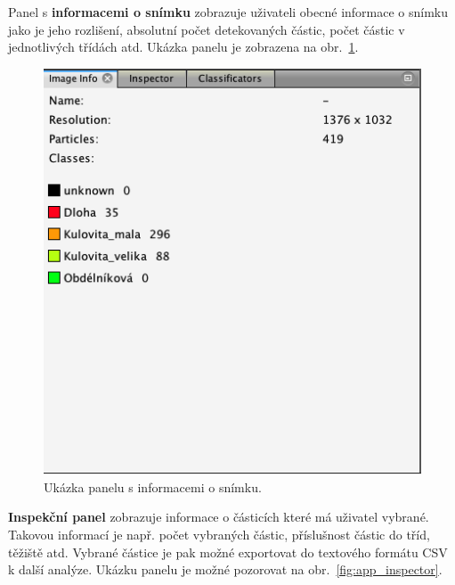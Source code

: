 \documentclass[11pt,twoside,a4paper,table]{book}
\begin{document}
Panel s \textbf{informacemi o snímku} zobrazuje uživateli obecné informace o snímku jako je jeho rozlišení, absolutní počet detekovaných částic, počet částic v jednotlivých třídách atd. Ukázka panelu je zobrazena na obr.~\ref{fig:app_image_info}.

\begin{figure}[h]
	\centering
	\includegraphics[scale=0.5]{figures/app_image_info.png}
	\caption{Ukázka panelu s informacemi o snímku.}
	\label{fig:app_image_info}
\end{figure}

\textbf{Inspekční panel} zobrazuje informace o částicích které má uživatel vybrané. Takovou informací je např. počet vybraných částic, příslušnost částic do tříd, těžiště atd. Vybrané částice je pak možné exportovat do textového formátu CSV k další analýze. Ukázku panelu je možné pozorovat na obr.~\ref{fig:app_inspector}.
\end{document}
